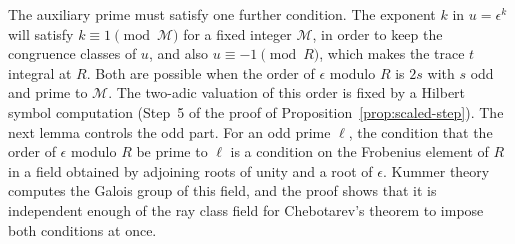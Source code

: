 \documentclass[11pt]{article}
\theoremstyle{plain}
\theoremstyle{definition}
\theoremstyle{remark}
\begin{document}
The auxiliary prime must satisfy one further condition.  The exponent
$k$ in $u=\epsilon^k$ will satisfy $k\equiv1\pmod{\mathcal M}$ for a fixed
integer $\mathcal M$, in order to keep the congruence classes of $u$, and
also $u\equiv-1\pmod R$, which makes the trace $t$ integral at $R$.  Both
are possible when the order of $\epsilon$ modulo $R$ is $2s$ with $s$ odd
and prime to $\mathcal M$.  The two-adic valuation of this order is fixed
by a Hilbert symbol computation (Step~5 of the proof of
Proposition~\ref{prop:scaled-step}).  The next lemma controls the odd
part.  For an odd prime $\ell$, the condition that the order of $\epsilon$
modulo $R$ be prime to $\ell$ is a condition on the Frobenius element of
$R$ in a field obtained by adjoining roots of unity and a root of
$\epsilon$.  Kummer theory \cite[Chapter~VII, Appendix~A,
Theorem~A.3]{MilneCFT} computes the Galois group of this field, and the
proof shows that it is independent enough of the ray class field for
Chebotarev's theorem to impose both conditions at once.
\end{document}
